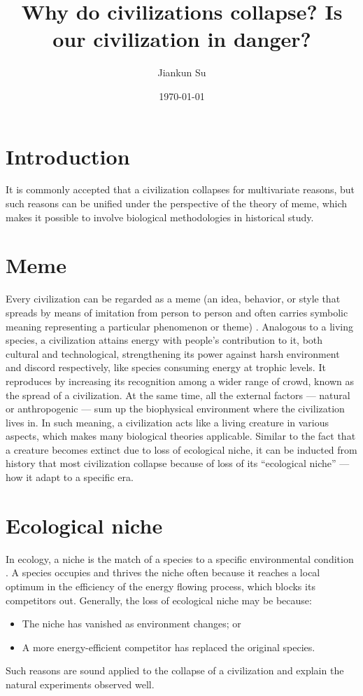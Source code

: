 \documentclass[a4paper,12pt]{article}
\title{Why do civilizations collapse? Is our civilization in danger?}
\author[1]{Jiankun Su}
\affil[1]{No.2 High School of East China Normal University}
\date{\today}
\begin{document}
    \maketitle
    \begin{center}
        \doclicenseText
    \end{center}
    \tableofcontents
    \newpage
    
    \section{Introduction}
    It is commonly accepted that a civilization collapses for multivariate reasons, but such reasons can be unified under the perspective of the theory of meme, which makes it possible to involve biological methodologies in historical study.
    
    \section{Meme}
    Every civilization can be regarded as a meme (an idea, behavior, or style that spreads by means of imitation from person to person and often carries symbolic meaning representing a particular phenomenon or theme) \cite{2016_TheSelfishGene}.
    Analogous to a living species, a civilization attains energy with people's contribution to it, both cultural and technological, strengthening its power against harsh environment and discord respectively, like species consuming energy at trophic levels.
    It reproduces by increasing its recognition among a wider range of crowd, known as the spread of a civilization.
    At the same time, all the external factors --- natural or anthropogenic --- sum up the biophysical environment where the civilization lives in.
    In such meaning, a civilization acts like a living creature in various aspects, which makes many biological theories applicable.
    Similar to the fact that a creature becomes extinct due to loss of ecological niche, it can be inducted from history that most civilization collapse because of loss of its ``ecological niche'' --- how it adapt to a specific era.
    
    \section{Ecological niche}
    In ecology, a niche is the match of a species to a specific environmental condition \cite{2015_TheEcoNiche}.
    A species occupies and thrives the niche often because it reaches a local optimum in the efficiency of the energy flowing process, which blocks its competitors out.
    Generally, the loss of ecological niche may be because:
    \begin{itemize}
        \item The niche has vanished as environment changes; or
        \item A more energy-efficient competitor has replaced the original species.
    \end{itemize}
    Such reasons are sound applied to the collapse of a civilization and explain the natural experiments observed well.
    
\end{document}
